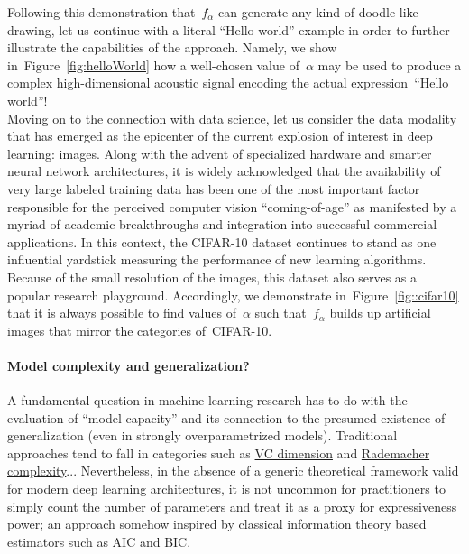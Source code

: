 \documentclass{article}
\begin{document}
\noindent Following this demonstration that~$f_\alpha$ can generate any kind of doodle-like drawing, let us continue with a literal ``Hello world'' example in order to further illustrate the capabilities of the approach. Namely, we show in~Figure~\ref{fig:helloWorld} how a well-chosen value of~$\alpha$ may be used to produce a complex high-dimensional acoustic signal encoding the actual expression~``Hello world''! \\

\noindent Moving on to the connection with data science, let us consider the data modality that has emerged as the epicenter of the current explosion of interest in deep learning: images.  Along with the advent of specialized hardware and smarter neural network architectures, it is widely acknowledged that the availability of very large labeled training data has been one of the most important factor responsible for the perceived computer vision ``coming-of-age'' as manifested by a myriad of academic breakthroughs and integration into successful commercial applications.  In this context, the CIFAR-10 dataset continues to stand as one influential yardstick measuring the performance of new learning algorithms.  Because of the small resolution of the images, this dataset also serves as a popular research playground.  Accordingly, we demonstrate in~Figure~\ref{fig::cifar10} that it is always possible to find values of~$\alpha$ such that~$f_\alpha$ builds up artificial images that mirror the categories of~CIFAR-10.

\paragraph{Model complexity and generalization?} A fundamental question in machine learning research has to do with the evaluation of ``model capacity'' and its connection to the presumed existence of generalization (even in strongly overparametrized models). Traditional approaches tend to fall in categories such as \href{https://en.wikipedia.org/wiki/Vapnik-Chervonenkis\_dimension}{VC dimension} and \href{https://en.wikipedia.org/wiki/Rademacher\_complexity}{Rademacher complexity}...  Nevertheless, in the absence of a generic theoretical framework valid for modern deep learning architectures, it is not uncommon for practitioners to simply count the number of parameters and treat it as a proxy for expressiveness power; an approach somehow inspired by classical information theory based estimators such as AIC and BIC. \\
\end{document}
